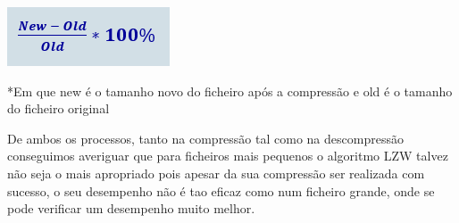 \documentclass[12pt, a4paper]{article}
\begin{document}
\bigskip
\includegraphics[scale=1]{Performance.png}
\vspace{20px}

\begin{justify} \begin{large}
*Em que new é o tamanho novo do ficheiro após a compressão e old é o tamanho do ficheiro original
\end{large} \end{justify}
\newpage

\bigskip
{}
\bigskip

\vspace{10px}
\begin{justify} \begin{Large}
De ambos os processos, tanto na compressão tal como na descompressão conseguimos averiguar que  para ficheiros mais pequenos o algoritmo LZW talvez não seja o mais apropriado pois apesar da sua compressão ser realizada com sucesso, o seu desempenho não é tao eficaz como num ficheiro grande, onde se pode verificar um desempenho muito melhor.
\end{Large} \end{justify}
\vspace{5px}
\end{document}
